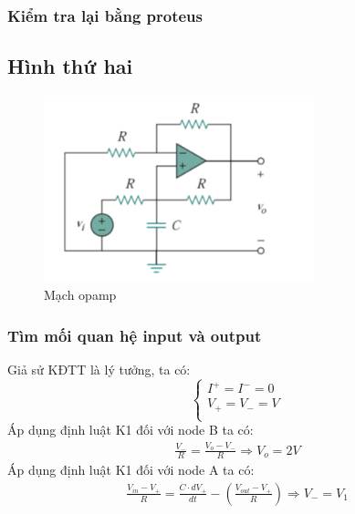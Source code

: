         \subsubsection{Kiểm tra lại bằng proteus}
    \subsection{Hình thứ hai}
        \begin{figure}[H]
            \centering
            \includegraphics[width=0.7\textwidth]{pictures/topic2_b.png}
            \caption{Mạch opamp}					
            \label{fig:circuit_simulation}
        \end{figure}
        \subsubsection{Tìm mối quan hệ input và output}
            \hspace*{0.6cm}Giả sử KĐTT là lý tưởng, ta có:
            \[
				\begin{cases}
					I^+ = I^- = 0\\
					V_{+} = V_{-} = V\\
				\end{cases}
			\]
            \hspace*{0.6cm}Áp dụng định luật K1 đối với node B ta có: 
            \begin{align*}
                \frac{V_{-}}{R} = \frac{V_{o} - V_{-}}{R} \Rightarrow V_{o}= 2V
            \end{align*}
            \hspace*{0.6cm}Áp dụng định luật K1 đối với node A ta có:
            \begin{align*}
                \frac{V_{in} - V_{+}}{R} = \frac{C \cdot dV_{+}}{dt} - (\frac{V_{out} - V_{+}}{R}) \Rightarrow V_{-} = V_{1}
            \end{align*}



            